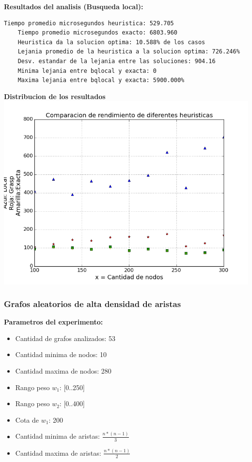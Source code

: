 \textbf{Resultados del analisis (Busqueda local):}
\begin{lstlisting}[frame=single]	
	Tiempo promedio microsegundos heuristica: 529.705
	Tiempo promedio microsegundos exacto: 6803.960
	Heuristica da la solucion optima: 10.588% de los casos
	Lejania promedio de la heuristica a la solucion optima: 726.246%
	Desv. estandar de la lejania entre las soluciones: 904.16
	Minima lejania entre bqlocal y exacta: 0
	Maxima lejania entre bqlocal y exacta: 5900.000%
\end{lstlisting}

\vspace{2cm}

\begin{center}	
	\textbf{Distribucion de los resultados}\\
	\includegraphics[scale=0.7]{experimentos/performance-optimalidad-intermedios/comparacion_optimalidad.png}
\end{center}


\subsubsection{Grafos aleatorios de alta densidad de aristas}
\textbf{Parametros del experimento:}
\begin{itemize}
	\item Cantidad de grafos analizados: 53
	\item Cantidad minima de nodos: 10
	\item Cantidad maxima de nodos: 280
	\item Rango peso $w_1$: [0..250]
	\item Rango peso $w_2$: [0..400]
	\item Cota de $w_1$: 200
	\item Cantidad minima de aristas: $\frac{n * (n-1)}{3}$
	\item Cantidad maxima de aristas: $\frac{n * (n-1)}{2}$
\end{itemize}

